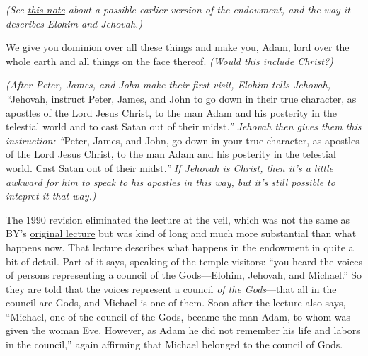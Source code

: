 		\begin{compactdesc}
			\item[{\hyperref[ENDOWMENT-alone]{The creation of Adam and Eve}}] \textit{(See \hyperref[ENDOWMENT-alone]{this note} about a possible earlier version of the endowment, and the way it describes Elohim and Jehovah.)}
			\item[{\hyperref[TEMPLE-ENDOWMENT-ENDOW-PRE-1990-GARDEN]{Adam as Lord}}] We give you dominion over all these things and make you, Adam, lord over the whole earth and all things on the face thereof. \textit{(Would this include Christ?)}
			\item[{\hyperref[TEMPLE-ENDOWMENT-ENDOW-PRE-1990-GARDEN]{Apostles of the Lord Jesus Christ}}] \textit{(After Peter, James, and John make their first visit, Elohim tells Jehovah, ``}Jehovah, instruct Peter, James, and John to go down in their true character, as apostles of the Lord Jesus Christ, to the man Adam and his posterity in the telestial world and to cast Satan out of their midst\textit{.'' Jehovah then gives them this instruction: ``}Peter, James, and John, go down in your true character, as apostles of the Lord Jesus Christ, to the man Adam and his posterity in the telestial world. Cast Satan out of their midst\textit{.'' If Jehovah is Christ, then it's a little awkward for him to speak to his apostles in this way, but it's still possible to intepret it that way.)}
			\item[{\hyperref[TEMPLE-ENDOWMENT-ENDOW-PRE-1990-LECTURE]{Newer lecture at the veil}}] The 1990 revision eliminated the lecture at the veil, which was not the same as BY's \hyperref[EMS-1877-BY-7-FEB-1877]{original lecture} but was kind of long and much more substantial than what happens now. That lecture describes what happens in the endowment in quite a bit of detail. Part of it says, speaking of the temple visitors: ``you heard the voices of persons representing a council of the Gods---Elohim, Jehovah, and Michael.'' So they are told that the voices represent a council \textit{of the Gods}---that all in the council are Gods, and Michael is one of them. Soon after the lecture also says, ``Michael, one of the council of the Gods, became the man Adam, to whom was given the woman Eve. However, as Adam he did not remember his life and labors in the council,'' again affirming that Michael belonged to the council of Gods.
		\end{compactdesc}
	
	
